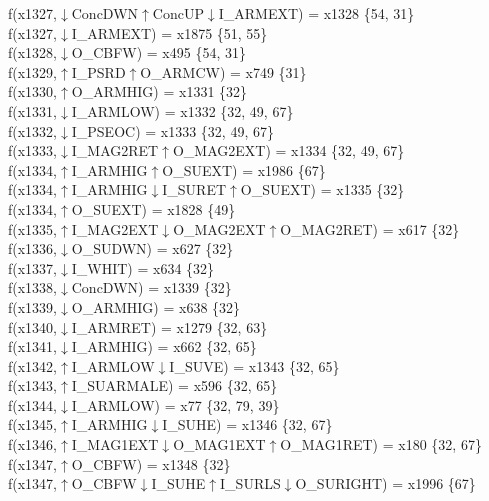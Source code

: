 f(x1327,$\downarrow$ConcDWN$\uparrow$ConcUP$\downarrow$I\_ARMEXT) = x1328 \{54, 31\} \\  
f(x1327,$\downarrow$I\_ARMEXT) = x1875 \{51, 55\} \\  
f(x1328,$\downarrow$O\_CBFW) = x495 \{54, 31\} \\  
f(x1329,$\uparrow$I\_PSRD$\uparrow$O\_ARMCW) = x749 \{31\} \\  
f(x1330,$\uparrow$O\_ARMHIG) = x1331 \{32\} \\  
f(x1331,$\downarrow$I\_ARMLOW) = x1332 \{32, 49, 67\} \\  
f(x1332,$\downarrow$I\_PSEOC) = x1333 \{32, 49, 67\} \\  
f(x1333,$\downarrow$I\_MAG2RET$\uparrow$O\_MAG2EXT) = x1334 \{32, 49, 67\} \\  
f(x1334,$\uparrow$I\_ARMHIG$\uparrow$O\_SUEXT) = x1986 \{67\} \\  
f(x1334,$\uparrow$I\_ARMHIG$\downarrow$I\_SURET$\uparrow$O\_SUEXT) = x1335 \{32\} \\  
f(x1334,$\uparrow$O\_SUEXT) = x1828 \{49\} \\  
f(x1335,$\uparrow$I\_MAG2EXT$\downarrow$O\_MAG2EXT$\uparrow$O\_MAG2RET) = x617 \{32\} \\  
f(x1336,$\downarrow$O\_SUDWN) = x627 \{32\} \\  
f(x1337,$\downarrow$I\_WHIT) = x634 \{32\} \\  
f(x1338,$\downarrow$ConcDWN) = x1339 \{32\} \\  
f(x1339,$\downarrow$O\_ARMHIG) = x638 \{32\} \\  
f(x1340,$\downarrow$I\_ARMRET) = x1279 \{32, 63\} \\  
f(x1341,$\downarrow$I\_ARMHIG) = x662 \{32, 65\} \\  
f(x1342,$\uparrow$I\_ARMLOW$\downarrow$I\_SUVE) = x1343 \{32, 65\} \\  
f(x1343,$\uparrow$I\_SUARMALE) = x596 \{32, 65\} \\  
f(x1344,$\downarrow$I\_ARMLOW) = x77 \{32, 79, 39\} \\  
f(x1345,$\uparrow$I\_ARMHIG$\downarrow$I\_SUHE) = x1346 \{32, 67\} \\  
f(x1346,$\uparrow$I\_MAG1EXT$\downarrow$O\_MAG1EXT$\uparrow$O\_MAG1RET) = x180 \{32, 67\} \\  
f(x1347,$\uparrow$O\_CBFW) = x1348 \{32\} \\  
f(x1347,$\uparrow$O\_CBFW$\downarrow$I\_SUHE$\uparrow$I\_SURLS$\downarrow$O\_SURIGHT) = x1996 \{67\} \\  
